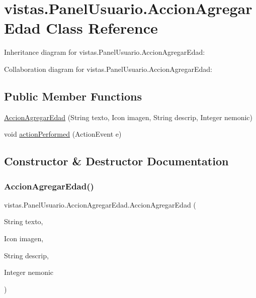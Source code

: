 \hypertarget{classvistas_1_1_panel_usuario_1_1_accion_agregar_edad}{}\section{vistas.\+Panel\+Usuario.\+Accion\+Agregar\+Edad Class Reference}
\label{classvistas_1_1_panel_usuario_1_1_accion_agregar_edad}


Inheritance diagram for vistas.\+Panel\+Usuario.\+Accion\+Agregar\+Edad\+:


Collaboration diagram for vistas.\+Panel\+Usuario.\+Accion\+Agregar\+Edad\+:
\subsection*{Public Member Functions}
\begin{DoxyCompactItemize}
\item 
\mbox{\hyperlink{classvistas_1_1_panel_usuario_1_1_accion_agregar_edad_a3565b9b11f4ffa7ca013a28a1660ff70}{Accion\+Agregar\+Edad}} (String texto, Icon imagen, String descrip, Integer nemonic)
\item 
void \mbox{\hyperlink{classvistas_1_1_panel_usuario_1_1_accion_agregar_edad_ab9cd4d3b054617348763f4ffb3b20a32}{action\+Performed}} (Action\+Event e)
\end{DoxyCompactItemize}


\subsection{Constructor \& Destructor Documentation}
\mbox{\label{classvistas_1_1_panel_usuario_1_1_accion_agregar_edad_a3565b9b11f4ffa7ca013a28a1660ff70}} 
\subsubsection{\texorpdfstring{Accion\+Agregar\+Edad()}{AccionAgregarEdad()}}
{\footnotesize\ttfamily vistas.\+Panel\+Usuario.\+Accion\+Agregar\+Edad.\+Accion\+Agregar\+Edad (\begin{DoxyParamCaption}\item[{String}]{texto,  }\item[{Icon}]{imagen,  }\item[{String}]{descrip,  }\item[{Integer}]{nemonic }\end{DoxyParamCaption})\hspace{0.3cm}{\ttfamily [inline]}}

